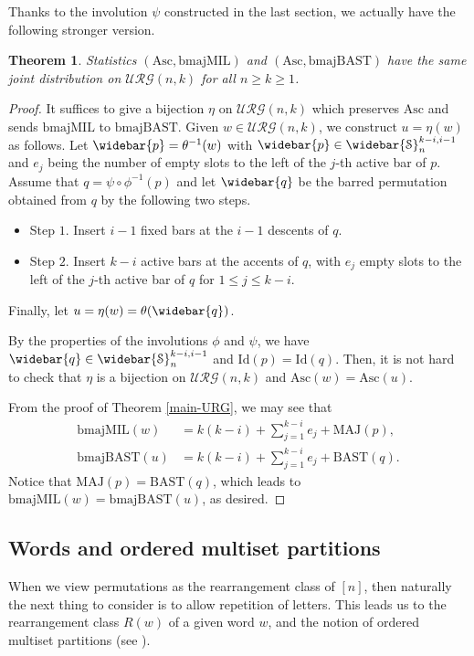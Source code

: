 \documentclass[12pt]{amsart}
\numberwithin{equation}{section}
\theoremstyle{plain}
\newtheorem{theorem}{Theorem}[section]
\theoremstyle{definition}
\def\MAJ{\mathrm{MAJ}}
\def\BAST{\mathrm{BAST}}
\def\bmajMIL{\mathrm{bmajMIL}}
\def\bmajBAST{\mathrm{bmajBAST}}
\def\Asc{\mathrm{Asc}}
\def\Id{\mathrm{Id}}
\def\SS{\mathcal{S}}
\def\URG{\mathcal{URG}}
\begin{document}
Thanks to the involution $\psi$ constructed in the last section, we actually have the following stronger version.
\begin{theorem}\label{main-URG-st}
Statistics $(\Asc, \bmajMIL)$ and
$(\Asc, \bmajBAST)$ have the same joint distribution on $\URG(n,k)$ for all $n \ge k\ge 1$.
\end{theorem}
\begin{proof}
It suffices to give a bijection $\eta$ on $\URG(n,k)$ which preserves $\Asc$ and sends $\bmajMIL$ to $\bmajBAST$.
Given $w \in \URG(n,k)$, we construct $u=\eta(w)$ as follows.
Let $\widebar{p}=\theta^{-1}(w)$ with
$\widebar{p}\in\widebar{\SS}_n^{k-i,i-1}$ and $e_j$ being the  number of empty slots to the left of the $j$-th active bar of $p$.
Assume that $q=\psi\circ \phi^{-1}(p)$ and let $\widebar{q}$ be the barred permutation obtained
from $q$ by the following two steps.
\begin{itemize}
  \item Step $1$. Insert $i-1$ fixed bars at the $i-1$ descents of $q$.
  \item Step $2$. Insert $k-i$ active bars at the accents of $q$,
                  with $e_j$ empty slots to the left of the $j$-th active bar of $q$ for $1 \leq j \leq k-i$. 
\end{itemize}
Finally, let $u=\eta(w)=\theta(\widebar{q})$.

By the properties of the involutions $\phi$ and $\psi$, we have  $\widebar{q}\in\widebar{\SS}_n^{k-i,i-1}$ and  $\Id(p)=\Id(q)$.
Then,  it is not hard to check that $\eta$ is a bijection on $\URG(n,k)$ and $\Asc(w)=\Asc(u)$.

From the proof of Theorem \ref{main-URG}, we may see that
\begin{align*}
  \bmajMIL(w) & =k(k-i)+ \sum_{j=1}^{k-i}e_j+\MAJ(p),\\
  \bmajBAST(u)& =k(k-i)+ \sum_{j=1}^{k-i}e_j+\BAST(q).
\end{align*}
Notice that $\MAJ(p)=\BAST(q)$, which leads to $\bmajMIL(w)=\bmajBAST(u)$, as desired.
\end{proof}
\subsection{Words and ordered multiset partitions}\label{subsec:multiset}
When we view permutations as the rearrangement class of $[n]$, then naturally the next thing to consider is to allow repetition of letters. This leads us to the rearrangement class $R(w)$ of a given word $w$, and the notion of ordered multiset partitions (see \cite{Rh}). 
\end{document}
